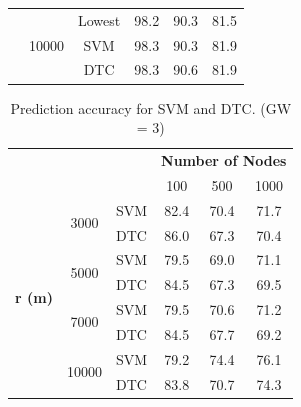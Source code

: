 \documentclass[conference]{IEEEtran}
\begin{document}
\begin{table}
\begin{tabular}{|c|c|c|c|c|c|}
                                 & \multirow{3}{*}{10000} & Lowest & 98.2          & 90.3          & 81.5          \\ \cline{3-6}
                                 &                        & SVM    & 98.3          & 90.3          & 81.9          \\ \cline{3-6}
                                 &                        & DTC    & 98.3          & 90.6          & 81.9          \\ \hline
\end{tabular}
\end{table}

\begin{table}
\centering
\caption{Prediction accuracy for SVM and DTC. (GW = 3)}
\label{table:prediction_accuracy}
\begin{tabular}{|c|c|c|c|c|c|}
\hline
\multicolumn{3}{|c|}{\multirow{2}{*}{}}                        & \multicolumn{3}{c|}{\textbf{Number of Nodes}} \\ \cline{4-6}
\multicolumn{3}{|c|}{}                                         & 100           & 500           & 1000          \\ \hline
\multirow{8}{*}{\textbf{r (m)}} & \multirow{2}{*}{3000}  & SVM & 82.4          & 70.4          & 71.7          \\ \cline{3-6}
                                &                        & DTC & 86.0          & 67.3          & 70.4          \\ \cline{2-6}

                                & \multirow{2}{*}{5000}  & SVM & 79.5          & 69.0          & 71.1          \\ \cline{3-6}
                                &                        & DTC & 84.5          & 67.3          & 69.5          \\ \cline{2-6}

                                & \multirow{2}{*}{7000}  & SVM & 79.5          & 70.6          & 71.2          \\ \cline{3-6}
                                &                        & DTC & 84.5          & 67.7          & 69.2          \\ \cline{2-6}

                                & \multirow{2}{*}{10000} & SVM & 79.2          & 74.4          & 76.1          \\ \cline{3-6}
                                &                        & DTC & 83.8          & 70.7          & 74.3          \\ \hline
\end{tabular}
\end{table}
\end{document}
